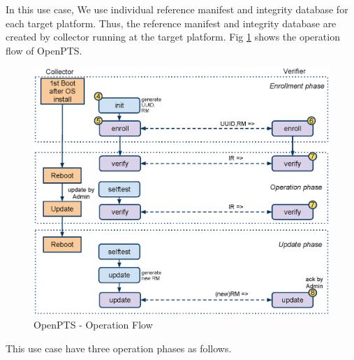


In this use case,
We use individual reference manifest and integrity database for each target platform.
Thus, the reference manifest and integrity database are created by collector running at the target platform.
Fig \ref{fig:openpts-selfupdate} shows the operation flow of OpenPTS.




\begin{figure}[hb!p]
  \begin{center}
    \includegraphics[width=15cm]{OpenPTS-fig-selfupdate.eps}
  \end{center}
  \caption{OpenPTS - Operation Flow}
  \label{fig:openpts-selfupdate}
\end{figure}


This use case have three operation phases as follows.

